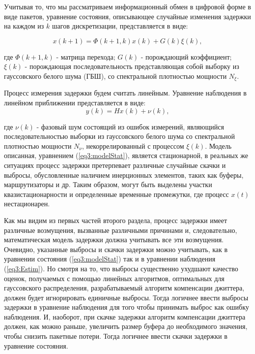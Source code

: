 Учитывая то, что мы рассматриваем информационный обмен в цифровой форме в виде пакетов, уравнение состояния, описывающее случайные изменения задержки на каждом из $k$ шагов дискретизации, представляется в виде:

\begin{equation}\label{eq3:modelStat}
x(k+1)=\Phi(k+1,k)x(k)+G(k)\xi(k),
\end{equation}

\noindent где $\Phi(k+1,k)$ - матрица перехода; $G(k)$ - порождающий коэффициент; $\xi(k)$ - порождающая последовательность представляющая собой выборку из гауссовского белого шума (ГБШ), со спектральной плотностью мощности $N_\xi$.

Процесс измерения задержки будем считать линейным. Уравнение наблюдения в линейном приближении представляется в виде:
\begin{equation}\label{eq3:Estim}
y(k)=Hx(k)+\nu(k),
\end{equation}

\noindent где $\nu(k)$ - фазовый шум состоящий из ошибок измерений, являющийся последовательностью выборки из гауссовского белого шума со спектральной плотностью мощности $N_\nu$, некоррелированный с процессом $\xi(k)$. 
Модель описанная, уравнением (\ref{eq3:modelStat}), является стационарной, в реальных же ситуациях процесс задержки претерпевает различные случайные скачки и выбросы, обусловленные наличием инерционных элементов, таких как буферы, маршрутизаторы и др. Таким образом, могут быть выделены участки квазистационарности и определенные временные промежутки, где процесс $x(t)$ нестационарен.

Как мы видим из первых частей второго раздела, процесс задержки имеет различные возмущения, вызванные различными причинами и, следовательно, математическая модель задержки должна учитывать все эти возмущения.
Очевидно, указанные выбросы и скачки задержки можно учитывать, как в уравнении состояния (\ref{eq3:modelStat}) так и в уравнении наблюдения (\ref{eq3:Estim}). 
Но смотря на то, что выбросы существенно ухудшают качество оценок, получаемых с помощью линейных алгоритмов, оптимальных для гауссовского распределения, разрабатываемый алгоритм компенсации джиттера, должен будет игнорировать единичные выбросы. Тогда логичнее ввести выбросы задержки в уравнение наблюдения для того чтобы принимать выброс как ошибку наблюдения. 
И, наоборот, при скачке задержки алгоритм компенсации джиттера должен, как можно раньше, увеличить размер буфера до необходимого значения, чтобы снизить пакетные потери. 
Тогда логичнее ввести скачки задержки в уравнение состояния.


